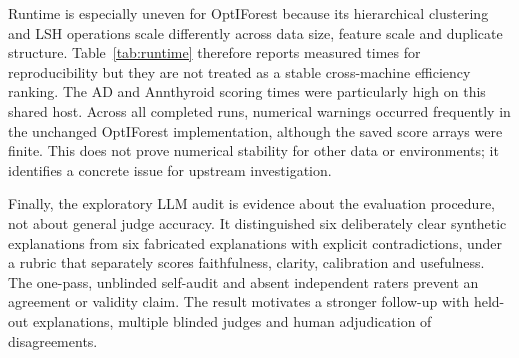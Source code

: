 Runtime is especially uneven for OptIForest because its hierarchical clustering and LSH operations scale differently across data size, feature scale and duplicate structure. Table~\ref{tab:runtime} therefore reports measured times for reproducibility but they are not treated as a stable cross-machine efficiency ranking. The AD and Annthyroid scoring times were particularly high on this shared host. Across all completed runs, numerical warnings occurred frequently in the unchanged OptIForest implementation, although the saved score arrays were finite. This does not prove numerical stability for other data or environments; it identifies a concrete issue for upstream investigation.

Finally, the exploratory LLM audit is evidence about the evaluation procedure, not about general judge accuracy. It distinguished six deliberately clear synthetic explanations from six fabricated explanations with explicit contradictions, under a rubric that separately scores faithfulness, clarity, calibration and usefulness. The one-pass, unblinded self-audit and absent independent raters prevent an agreement or validity claim. The result motivates a stronger follow-up with held-out explanations, multiple blinded judges and human adjudication of disagreements.
